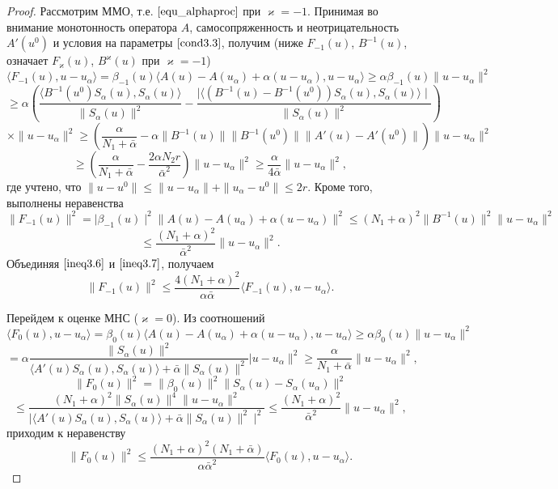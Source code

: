 \begin{proof} Рассмотрим  ММО, т.е. $\eqref{equ_alphaproc}$ при $\varkappa=-1$. Принимая во внимание монотонность оператора $A$, самосопряженность и неотрицательность $A'(u^0)$ и условия на параметры $\eqref{cond3.3}$, получим (ниже $F_{-1}(u)$, $B^{-1}(u)$, означает $F_\varkappa(u)$, $B^\varkappa(u)$ при $\varkappa=-1$)
$$ \langle F_{-1}(u), u-u_\alpha\rangle=\beta_{-1}(u)\langle A(u)-A(u_\alpha)+ \alpha(u-u_\alpha),u-u_\alpha\rangle\ge\alpha\beta_{-1}(u)\|u-u_\alpha\|^2
$$ $$\ge\alpha\left(\frac{\langle B^{-1}(u^0)S_\alpha(u), S_\alpha(u)\rangle}{\|S_\alpha (u)\|^2}-\frac{\mid\langle (B^{-1}(u)-B^{-1}(u^0))S_\alpha(u), S_\alpha (u)\rangle \mid}{\|S_\alpha (u)\|^2}\right)$$
$$\times \|u-u_\alpha\|^2 \ge\left(\frac{\alpha}{N_1+\bar\alpha}-\alpha\|B^{-1}(u)\|\|B^{-1}(u^0)\|\|A'(u)-A'(u^0)\|\right)\|u-u_\alpha\|^2$$ 
\begin{equation}\label{ineq3.6}
\ge\left(\frac{\alpha}{N_1+\bar\alpha}-\frac{2\alpha N_2r}{\bar\alpha ^2}\right)\|u-u_\alpha\|^2\ge\frac{\alpha}{4\bar\alpha}\|u-u_\alpha\|^2,\end{equation}
где учтено, что $\|u-u^0\|\le\|u-u_\alpha\|+\|u_\alpha-u^0\|\le 2r.$ Кроме того, выполнены неравенства $$\|F_{-1}(u)\|^2=\mid\beta_{-1}(u)\mid^2\|A(u)-A(u_\alpha)+\alpha(u-u_\alpha)\|^2\le(N_1+\alpha)^2\|B^{-1}(u)\|^2\|u-u_\alpha\|^2 $$
\begin{equation}\label{ineq3.7}
\le\frac{(N_1+\alpha)^2}{\bar\alpha^2}\|u-u_\alpha\|^2 .
\end{equation}
Объединяя $\eqref{ineq3.6}$ и $\eqref{ineq3.7}$, получаем
\begin{equation}\label{ineq3.8}
\|F_{-1}(u)\|^2\le\frac{4(N_1+\alpha)^2}{\alpha\bar\alpha}\langle F_{-1}(u), u-u_\alpha\rangle.
\end{equation}

Перейдем к оценке МНС ($\varkappa=0$). Из соотношений
$$\langle F_0(u), u-u_\alpha\rangle=\beta_0(u)\langle A(u)-A(u_\alpha)+\alpha(u-u_\alpha), u-u_\alpha\rangle\ge\alpha\beta_0(u)\|u-u_\alpha\|^2$$ 
\begin{equation}\label{ineq3.9}
=\alpha\frac{\|S_\alpha (u)\|^2}{\langle A'(u)S_\alpha (u),S_\alpha (u)\rangle +\bar\alpha\|S_\alpha (u)\|^2}|u-u_\alpha\|^2\ge \frac{\alpha}{N_1+\bar\alpha}\|u-u_\alpha\|^2,\end{equation}
$$
\|F_0(u)\|^2=\|\beta_0(u)\|^2\|S_\alpha(u)-S_\alpha(u_\alpha)\|^2 $$
\begin{equation}\label{ineq3.10}\le\frac{(N_1+\alpha)^2\|S_\alpha (u)\|^4\|u-u_\alpha\|^2}{\mid\langle A'(u)S_\alpha (u),S_\alpha (u)\rangle +\bar\alpha\|S_\alpha (u)\|^2\mid ^2}\le\frac{(N_1+\alpha)^2}{\bar\alpha^2}\|u-u_\alpha\|^2,
\end{equation}
\vskip 10pt
приходим к неравенству
$$\|F_0(u)\|^2\le\frac{(N_1+\alpha)^2(N_1+\bar\alpha)}{\alpha\bar\alpha^2}\langle F_0(u), u-u_\alpha\rangle.$$


\end{proof}
